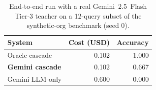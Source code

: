 \begin{table}[t]
\centering
\small
\caption{End-to-end run with a real Gemini~2.5~Flash Tier-3 teacher
on a 12-query subset of the synthetic-org
benchmark (seed 0).}
\label{tab:gemini}
\begin{tabular}{lrr}
\toprule
System & Cost (USD) & Accuracy \\
\midrule
Oracle cascade & 0.102 & 1.000 \\
\textbf{Gemini cascade} & 0.102 & 0.667 \\
Gemini LLM-only & 0.600 & 0.000 \\
\bottomrule
\end{tabular}
\end{table}
